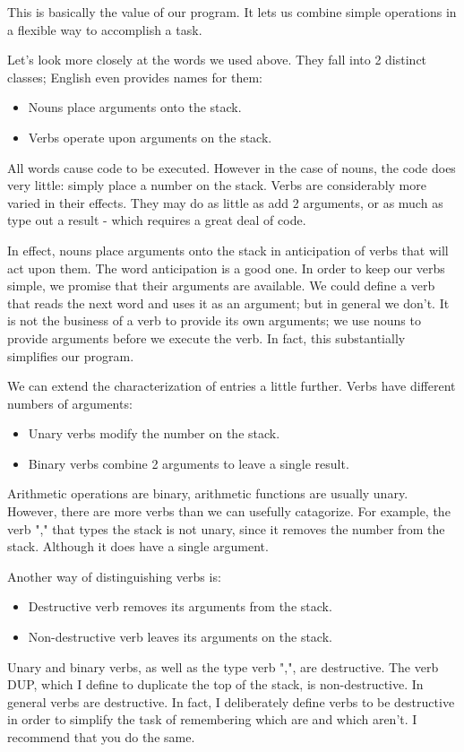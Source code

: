 \documentclass[b5paper, oneside]{book}
\begin{document}
This is basically the value of our program. It lets us combine simple operations in a flexible way to accomplish a task.

Let's look more closely at the words we used above. They fall into 2 distinct classes; English even provides names for them:\begin{itemize}
   \item Nouns place arguments onto the stack.
   \item Verbs operate upon arguments on the stack.\end{itemize}
All words cause code to be executed. However in the case of nouns, the code does very little: simply place a number on the stack. Verbs are considerably more varied in their effects. They may do as little as add 2 arguments, or as much as type out a result - which requires a great deal of code.

In effect, nouns place arguments onto the stack in anticipation of verbs that will act upon them. The word anticipation is a good one. In order to keep our verbs simple, we promise that their arguments are available. We could define a verb that reads the next word and uses it as an argument; but in general we don't. It is not the business of a verb to provide its own arguments; we use nouns to provide arguments before we execute the verb. In fact, this substantially simplifies our program.

We can extend the characterization of entries a little further. Verbs have different numbers of arguments:\begin{itemize}
   \item Unary verbs modify the number on the stack.
   \item Binary verbs combine 2 arguments to leave a single result.\end{itemize}
Arithmetic operations are binary, arithmetic functions are usually unary. However, there are more verbs than we can usefully catagorize. For example, the verb "," that types the stack is not unary, since it removes the number from the stack. Although it does have a single argument.

Another way of distinguishing verbs is:\begin{itemize}
   \item Destructive verb removes its arguments from the stack.
   \item Non-destructive verb leaves its arguments on the stack.\end{itemize}
Unary and binary verbs, as well as the type verb ",", are destructive. The verb DUP, which I define to duplicate the top of the stack, is non-destructive. In general verbs are destructive. In fact, I deliberately define verbs to be destructive in order to simplify the task of remembering which are and which aren't. I recommend that you do the same.
\end{document}
